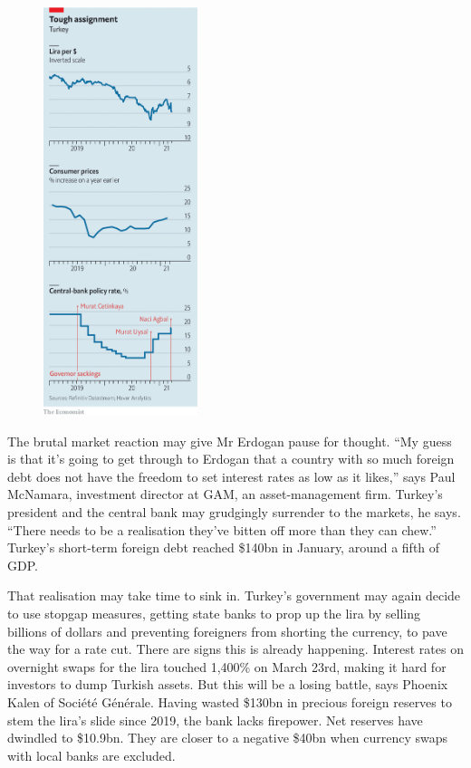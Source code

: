 \documentclass{article}
\begin{document}
\begin{figure}[h]
\centering
\includegraphics[width=0.4\textwidth]{images/20210327_euc265_0.png}
\end{figure}


The brutal market reaction may give Mr Erdogan pause for thought. ``My guess is that it's going to get through to Erdogan that a country with so much foreign debt does not have the freedom to set interest rates as low as it likes,'' says Paul McNamara, investment director at GAM, an asset-management firm. Turkey's president and the central bank may grudgingly surrender to the markets, he says. ``There needs to be a realisation they've bitten off more than they can chew.'' Turkey's short-term foreign debt reached \$140bn in January, around a fifth of GDP. 

That realisation may take time to sink in. Turkey's government may again decide to use stopgap measures, getting state banks to prop up the lira by selling billions of dollars and preventing foreigners from shorting the currency, to pave the way for a rate cut. There are signs this is already happening. Interest rates on overnight swaps for the lira touched 1,400\% on March 23rd, making it hard for investors to dump Turkish assets. But this will be a losing battle, says Phoenix Kalen of Société Générale. Having wasted \$130bn in precious foreign reserves to stem the lira's slide since 2019, the bank lacks firepower. Net reserves have dwindled to \$10.9bn. They are closer to a negative \$40bn when currency swaps with local banks are excluded. 
\end{document}
